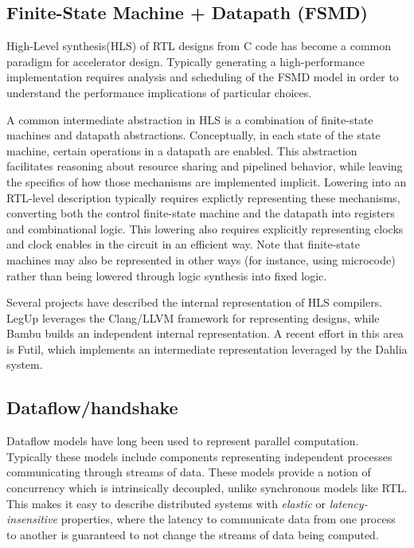 \documentclass{tufte-handout}
\begin{document}
\subsection{Finite-State Machine + Datapath (FSMD)}\label{sec:fsmd}
High-Level synthesis(HLS) of RTL designs from C code has become a common paradigm for accelerator design\cite{cong11HLS}\cite{kastner2018parallel}.  Typically generating a high-performance implementation requires analysis and scheduling of the FSMD model in order to understand the performance implications of particular choices\cite{zhang13sdc}.

A common intermediate abstraction in HLS is a combination of finite-state machines and datapath abstractions.  Conceptually, in each state of the state machine, certain operations in a datapath are enabled.  This abstraction facilitates reasoning about resource sharing and pipelined behavior, while leaving the specifics of how those mechanisms are implemented implicit.  Lowering into an RTL-level description typically requires explictly representing these mechanisms, converting both the control finite-state machine and the datapath into registers and combinational logic. This lowering also requires explicitly representing clocks and clock enables in the circuit in an efficient way.  Note that finite-state machines may also be represented in other ways (for instance, using microcode) rather than being lowered through logic synthesis into fixed logic. 

Several projects have described the internal representation of HLS compilers.  LegUp\cite{canis13legup} leverages the Clang/LLVM framework for representing designs, while Bambu\cite{pilato13bambu}
builds an independent internal representation.  A recent effort in this area is Futil\cite{futil}, which implements an intermediate representation leveraged by the Dahlia system\cite{nigam20dahlia}.

\subsection{Dataflow/handshake}\label{sec:handshake}
Dataflow models have long been used to represent parallel computation.  Typically these models include components representing independent processes communicating through streams of data. These models provide a notion of concurrency which is intrinsically decoupled, unlike synchronous models like RTL.  This makes it easy to describe distributed systems with \emph{elastic} or \emph{latency-insensitive} properties, where the latency to communicate data from one process to another is guaranteed to not change the streams of data being computed.
\end{document}

